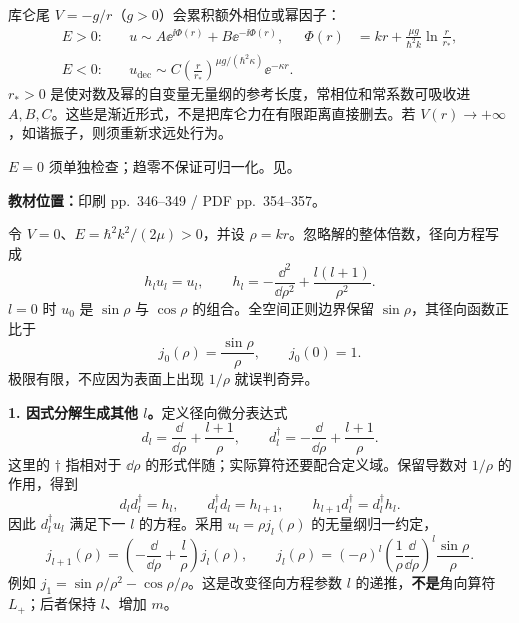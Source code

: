 库仑尾 $V=-g/r$（$g>0$）会累积额外相位或幂因子：
\begin{equation}
  \begin{aligned}
    E>0:&\quad u\sim A\ee^{\ii\Phi(r)}+B\ee^{-\ii\Phi(r)},
       &\Phi(r)&=kr+\frac{\mu g}{\hbar^2k}\ln\frac r{r_*},\\
    E<0:&\quad u_{\mathrm{dec}}\sim
       C\left(\frac r{r_*}\right)^{\mu g/(\hbar^2\kappa)}\ee^{-\kappa r}.
  \end{aligned}
\end{equation}
$r_*>0$ 是使对数及幂的自变量无量纲的参考长度，常相位和常系数可吸收进 $A,B,C$。这些是渐近形式，不是把库仑力在有限距离直接删去。若 $V(r)\to+\infty$，如谐振子，则须重新求远处行为。

$E=0$ 须单独检查；趋零不保证可归一化。见。

\textbf{教材位置：}印刷 pp.~346--349 / PDF pp.~354--357。

令 $V=0$、$E=\hbar^2k^2/(2\mu)>0$，并设 $\rho=kr$。忽略解的整体倍数，径向方程写成
\begin{equation}
  h_lu_l=u_l,\qquad
  h_l=-\frac{\dd^2}{\dd\rho^2}+\frac{l(l+1)}{\rho^2}.
\end{equation}
$l=0$ 时 $u_0$ 是 $\sin\rho$ 与 $\cos\rho$ 的组合。全空间正则边界保留 $\sin\rho$，其径向函数正比于
\begin{equation}
  \boxed{j_0(\rho)=\frac{\sin\rho}{\rho},\qquad j_0(0)=1.}
\end{equation}
极限有限，不应因为表面上出现 $1/\rho$ 就误判奇异。

\textbf{1. 因式分解生成其他 $l$。}定义径向微分表达式
\begin{equation}
  d_l=\frac{\dd}{\dd\rho}+\frac{l+1}{\rho},\qquad
  d_l^\dagger=-\frac{\dd}{\dd\rho}+\frac{l+1}{\rho}.
\end{equation}
这里的 $\dagger$ 指相对于 $\dd\rho$ 的形式伴随；实际算符还要配合定义域。保留导数对 $1/\rho$ 的作用，得到
\begin{equation}
  d_ld_l^\dagger=h_l,\qquad d_l^\dagger d_l=h_{l+1},
  \qquad h_{l+1}d_l^\dagger=d_l^\dagger h_l.
\end{equation}
因此 $d_l^\dagger u_l$ 满足下一 $l$ 的方程。采用 $u_l=\rho j_l(\rho)$ 的无量纲归一约定，
\begin{equation}
  \boxed{j_{l+1}(\rho)=\left(-\frac{\dd}{\dd\rho}+\frac l\rho\right)j_l(\rho),
  \qquad j_l(\rho)=(-\rho)^l
    \left(\frac1\rho\frac{\dd}{\dd\rho}\right)^l\frac{\sin\rho}{\rho}.}
\end{equation}
例如 $j_1=\sin\rho/\rho^2-\cos\rho/\rho$。这是改变径向方程参数 $l$ 的递推，\textbf{不是}角向算符 $L_+$；后者保持 $l$、增加 $m$。

